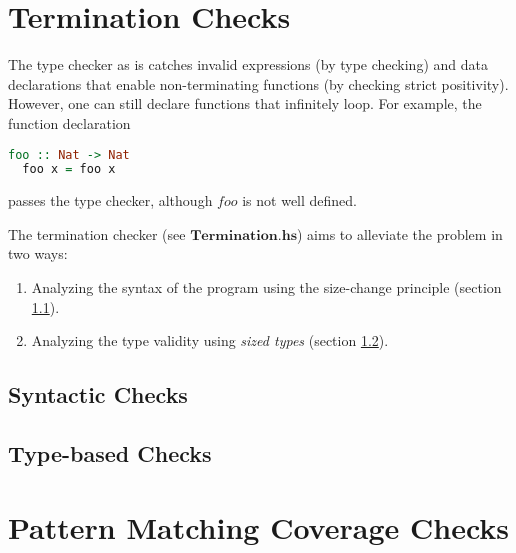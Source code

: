 \documentclass[acmsmall]{acmart}
\numberwithin{figure}{subsection}
\begin{document}
\section{Termination Checks}
\label{sec:termination}

The type checker as is catches invalid expressions (by type checking) and data declarations that enable non-terminating functions (by checking strict positivity). However, one can still declare functions that infinitely loop. For example, the function declaration

\begin{lstlisting}[language=haskell]
  foo :: Nat -> Nat
  foo x = foo x
\end{lstlisting}

passes the type checker, although $foo$ is not well defined.

The termination checker (see $\boldsymbol{Termination.hs}$) aims to alleviate the problem in two ways:

\begin{enumerate}
  \item Analyzing the syntax of the program using the size-change principle (section \ref{sec:synTermination}).
  \item Analyzing the type validity using \emph{sized types} (section \ref{sec:typeTermination}).
\end{enumerate}

\subsection{Syntactic Checks}
\label{sec:synTermination}



\subsection{Type-based Checks}
\label{sec:typeTermination}

\section{Pattern Matching Coverage Checks}
\label{sec:pattern}
\end{document}
